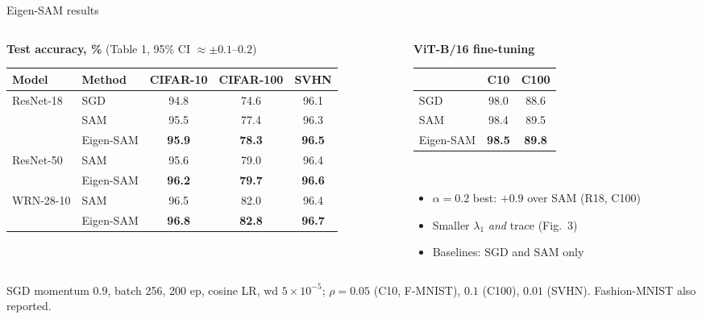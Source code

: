 \documentclass[aspectratio=169,10pt]{beamer}
\newcommand{\sh}[1]{\textcolor{sharp}{#1}}
\newcommand{\mt}[1]{\textcolor{muted}{#1}}
\newcommand{\source}[1]{\par\vfill{\scriptsize\mt{#1}}}
\newcommand{\best}[1]{\textbf{#1}}
\begin{document}
\begin{frame}{Eigen-SAM results}
\begin{columns}[T]
\begin{column}{0.6\textwidth}
\centering\small
\textbf{Test accuracy, \%} \mt{(Table 1, 95\% CI $\approx\pm0.1$--$0.2$)}\\[3pt]
\begin{tabular}{@{}llccc@{}}
\toprule
Model & Method & CIFAR-10 & CIFAR-100 & SVHN\\
\midrule
ResNet-18 & SGD & 94.8 & 74.6 & 96.1\\
 & SAM & 95.5 & 77.4 & 96.3\\
 & Eigen-SAM & \best{95.9} & \best{78.3} & \best{96.5}\\
\midrule
ResNet-50 & SAM & 95.6 & 79.0 & 96.4\\
 & Eigen-SAM & \best{96.2} & \best{79.7} & \best{96.6}\\
\midrule
WRN-28-10 & SAM & 96.5 & 82.0 & 96.4\\
 & Eigen-SAM & \best{96.8} & \best{82.8} & \best{96.7}\\
\bottomrule
\end{tabular}
\end{column}
\begin{column}{0.38\textwidth}
\small
\textbf{ViT-B/16 fine-tuning}\\[3pt]
\begin{tabular}{@{}lcc@{}}
\toprule
& C10 & C100\\
\midrule
SGD & 98.0 & 88.6\\
SAM & 98.4 & 89.5\\
Eigen-SAM & \best{98.5} & \best{89.8}\\
\bottomrule
\end{tabular}\\[8pt]
\begin{itemize}\setlength{\itemsep}{0.3em}
  \item $\alpha=0.2$ best: $+0.9$ over SAM (R18, C100)
  \item Smaller $\lambda_1$ \emph{and} trace (Fig.\ 3)
  \item \sh{Baselines: SGD and SAM only}
\end{itemize}
\end{column}
\end{columns}
\source{SGD momentum 0.9, batch 256, 200 ep, cosine LR, wd $5\!\times\!10^{-5}$; $\rho=0.05$ (C10, F-MNIST), $0.1$ (C100), $0.01$ (SVHN). Fashion-MNIST also reported.}
\end{frame}
\end{document}
